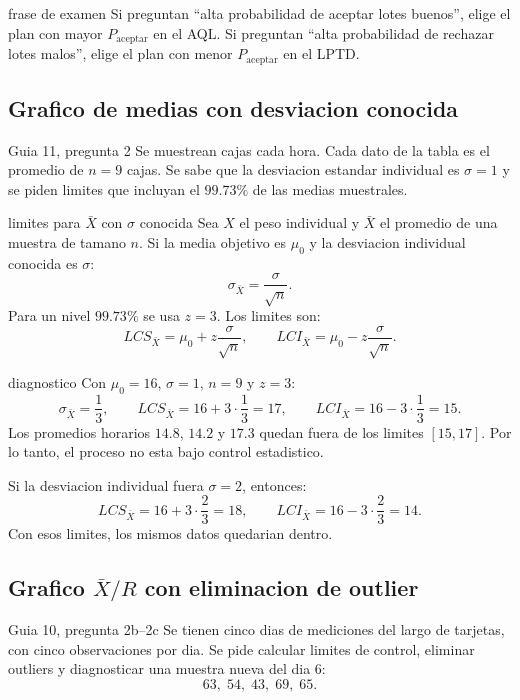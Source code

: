 \begin{alerta}{frase de examen}
Si preguntan ``alta probabilidad de aceptar lotes buenos'', elige el plan con mayor $P_{\text{aceptar}}$ en el AQL. Si preguntan ``alta probabilidad de rechazar lotes malos'', elige el plan con menor $P_{\text{aceptar}}$ en el LPTD.
\end{alerta}

\subsection{Grafico de medias con desviacion conocida}

\begin{ejercicio}{Guia 11, pregunta 2}
Se muestrean cajas cada hora. Cada dato de la tabla es el promedio de $n=9$ cajas. Se sabe que la desviacion estandar individual es $\sigma=1$ y se piden limites que incluyan el $99.73\%$ de las medias muestrales.
\end{ejercicio}

\begin{materia}{limites para $\bar X$ con $\sigma$ conocida}
Sea $X$ el peso individual y $\bar X$ el promedio de una muestra de tamano $n$. Si la media objetivo es $\mu_0$ y la desviacion individual conocida es $\sigma$:
\[
  \sigma_{\bar X}=\frac{\sigma}{\sqrt n}.
\]
Para un nivel $99.73\%$ se usa $z=3$. Los limites son:
\[
  LCS_{\bar X}=\mu_0+z\frac{\sigma}{\sqrt n},
  \qquad
  LCI_{\bar X}=\mu_0-z\frac{\sigma}{\sqrt n}.
\]
\end{materia}

\begin{solucion}{diagnostico}
Con $\mu_0=16$, $\sigma=1$, $n=9$ y $z=3$:
\[
  \sigma_{\bar X}=\frac{1}{3},\qquad
  LCS_{\bar X}=16+3\cdot \frac13=17,\qquad
  LCI_{\bar X}=16-3\cdot \frac13=15.
\]
Los promedios horarios $14.8$, $14.2$ y $17.3$ quedan fuera de los limites $[15,17]$. Por lo tanto, el proceso no esta bajo control estadistico.

Si la desviacion individual fuera $\sigma=2$, entonces:
\[
  LCS_{\bar X}=16+3\cdot \frac{2}{3}=18,\qquad
  LCI_{\bar X}=16-3\cdot \frac{2}{3}=14.
\]
Con esos limites, los mismos datos quedarian dentro.
\end{solucion}

\subsection{Grafico $\bar X/R$ con eliminacion de outlier}

\begin{ejercicio}{Guia 10, pregunta 2b--2c}
Se tienen cinco dias de mediciones del largo de tarjetas, con cinco observaciones por dia. Se pide calcular limites de control, eliminar outliers y diagnosticar una muestra nueva del dia 6:
\[
  63,\;54,\;43,\;69,\;65.
\]
\end{ejercicio}


